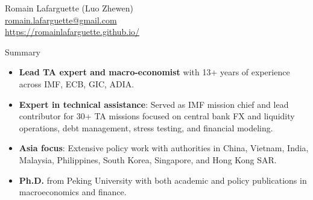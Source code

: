 \documentclass[usegeometry, 10pt, a4paper]{cv} %
\begin{document}
\hspace{10mm}
\begin{chapeau}
\begin{adresse}
\begin{flushleft}
    Romain Lafarguette (Luo Zhewen)\\
    \href{mailto:romain.lafarguette@gmail.com}{romain.lafarguette@gmail.com}\\
    \url{https://romainlafarguette.github.io/} \\
\end{flushleft}
\end{adresse}
\end{chapeau}

\vspace{-0.5cm}
\begin{rubriquetableau}[0.95\textwidth]{Summary}\\
  \vspace{-1cm}
  \begin{itemize}
  \item \textbf{Lead TA expert and macro-economist} with 13+ years of experience across IMF, ECB, GIC, ADIA.
  \item \textbf{Expert in technical assistance}: Served as IMF mission chief and lead contributor for 30+ TA missions focused on central bank FX and liquidity operations, debt management, stress testing, and financial modeling.
  \item \textbf{Asia focus}: Extensive policy work with authorities in China, Vietnam, India, Malaysia, Philippines, South Korea, Singapore, and Hong Kong SAR.
  \item \textbf{Ph.D.} from Peking University with both academic and policy publications in macroeconomics and finance.
  \end{itemize}
\end{rubriquetableau}

\vspace{0.2cm}
\end{document}
